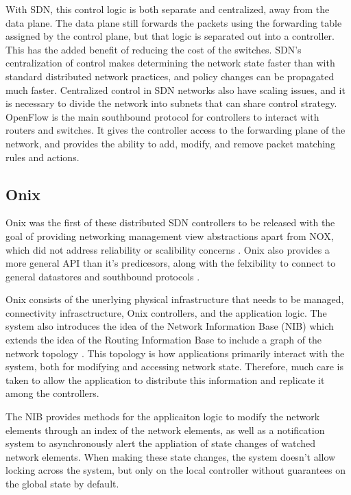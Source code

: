 \documentclass[letterpaper,twocolumn,10pt]{article}
\begin{document}
With SDN, this control logic is both separate and centralized, away from the data plane. The data plane still forwards the packets using the forwarding table assigned by the control plane, but that logic is separated out into a controller. This has the added benefit of reducing the cost of the switches. SDN's centralization of control makes determining the network state faster than with standard distributed network practices, and policy changes can be propagated much faster.
Centralized control in SDN networks also have scaling issues, and it is necessary to divide the network into subnets that can share control strategy. OpenFlow is the main southbound protocol for controllers to interact with routers and switches. It gives the controller access to the forwarding plane of the network, and provides the ability to add, modify, and remove packet matching rules and actions.\cite{mckeown2008openflow}

% 
% 
\subsection{Onix}

Onix was the first of these distributed SDN controllers to be released with the goal of providing networking management view abstractions apart from NOX, which did not address reliability or scalibility concerns \cite{feamster2014road}. Onix also provides a more general API than it's predicesors, along with the felxibility to connect to general datastores and southbound protocols \cite{koponen2010onix}.

Onix consists of the unerlying physical infrastructure that needs to be managed, connectivity infrasctructure, Onix controllers, and the application logic. The system also introduces the idea of the Network Information Base (NIB) which extends the idea of the Routing Information Base to include a graph of the network topology \cite{network2015topologies}. This topology is how applications primarily interact with the system, both for modifying and accessing network state. Therefore, much care is taken to allow the application to distribute this information and replicate it among the controllers.

The NIB provides methods for the applicaiton logic to modify the network elements through an index of the network elements, as well as a notification system to asynchronously alert the appliation of state changes of watched network elements. When making these state changes, the system doesn't allow locking across the system, but only on the local controller without guarantees on the global state by default. 
\end{document}
